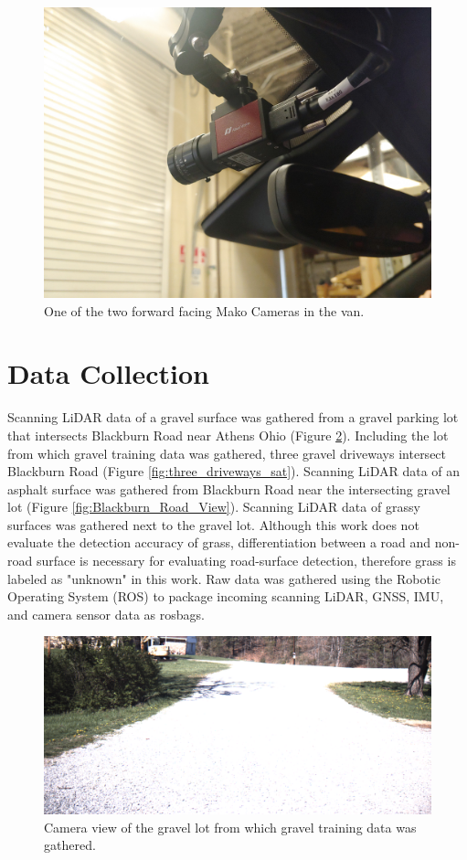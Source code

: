 \documentclass[numbered,pdftex]{ohio-etd}
\begin{document}
{{		\begin{figure}[H]
			\centering
			\includegraphics[width=0.7\linewidth]{Defense_Images/Mako_Camera}
			\caption[Mako Camera]{One of the two forward facing Mako Cameras in the van.}
			\label{fig:makocamera}
		\end{figure}
	
	} %
	
	\section{Data Collection}{
		
		{Scanning LiDAR data of a gravel surface was gathered from a gravel parking lot that intersects Blackburn Road near Athens Ohio (Figure \ref{fig:gravel_training_lot}). Including the lot from which gravel training data was gathered, three gravel driveways intersect Blackburn Road (Figure \ref{fig:three_driveways_sat}). Scanning LiDAR data of an asphalt surface was gathered from Blackburn Road near the intersecting gravel lot (Figure \ref{fig:Blackburn_Road_View}). Scanning LiDAR data of grassy surfaces was gathered next to the gravel lot. Although this work does not evaluate the detection accuracy of grass, differentiation between a road and non-road surface is necessary for evaluating road-surface detection, therefore grass is labeled as "unknown" in this work. Raw data was gathered using the Robotic Operating System (ROS) to package incoming scanning LiDAR, GNSS, IMU, and camera sensor data as rosbags.}
		
		\begin{figure}[H]
			\centering
			\includegraphics[width=0.75\linewidth]{Defense_Images/gravel_training_lot}
			\caption[Gravel Training Lot]{Camera view of the gravel lot from which gravel training data was gathered.}
			\label{fig:gravel_training_lot}
		\end{figure}
		
}}
\end{document}

